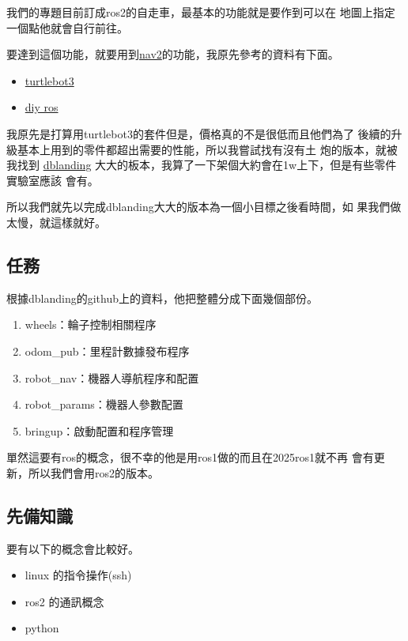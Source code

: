 
我們的專題目前訂成ros2的自走車，最基本的功能就是要作到可以在
地圖上指定一個點他就會自行前往。

要達到這個功能，就要用到\href{https://navigation.ros.org/}{nav2}的功能，我原先參考的資料有下面。
\begin{itemize}
    \item \href{https://emanual.robotis.com/docs/en/platform/turtlebot3/quick-start/}{turtlebot3} 
    \item \href{https://github.com/dblanding/diy-ROS-robot/tree/main}{diy ros}
\end{itemize}

我原先是打算用turtlebot3的套件但是，價格真的不是很低而且他們為了
後續的升級基本上用到的零件都超出需要的性能，所以我嘗試找有沒有土
炮的版本，就被我找到
\href {https://github.com/dblanding}{dblanding}
大大的板本，我算了一下架個大約會在1w上下，但是有些零件實驗室應該
會有。

所以我們就先以完成dblanding大大的版本為一個小目標之後看時間，如
果我們做太慢，就這樣就好。

\subsection{任務}

根據dblanding的github上的資料，他把整體分成下面幾個部份。
\begin{enumerate}
    \item    wheels：輪子控制相關程序
    \item    odom\_pub：里程計數據發布程序
    \item    robot\_nav：機器人導航程序和配置
    \item    robot\_params：機器人參數配置
    \item    bringup：啟動配置和程序管理
\end{enumerate}

單然這要有ros的概念，很不幸的他是用ros1做的而且在2025ros1就不再
會有更新，所以我們會用ros2的版本。

\subsection{先備知識}
要有以下的概念會比較好。
\begin{itemize}
    \item linux 的指令操作(ssh)
    \item ros2 的通訊概念
    \item python
\end{itemize}
